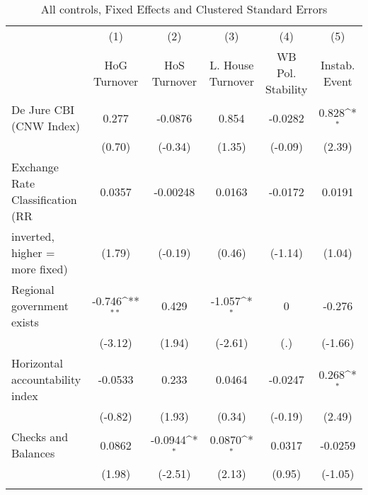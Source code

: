 \begin{table}[htbp]\centering
\def\sym#1{\ifmmode^{#1}\else\(^{#1}\)\fi}
\caption{All controls, Fixed Effects and Clustered Standard Errors \label{fullcmultIndFEDJ}}
\begin{tabular}{l*{5}{c}}
\toprule
                                        &\multicolumn{1}{c}{(1)}&\multicolumn{1}{c}{(2)}&\multicolumn{1}{c}{(3)}&\multicolumn{1}{c}{(4)}&\multicolumn{1}{c}{(5)}\\
                                        &\multicolumn{1}{c}{HoG Turnover}&\multicolumn{1}{c}{HoS Turnover}&\multicolumn{1}{c}{L. House Turnover}&\multicolumn{1}{c}{WB Pol. Stability}&\multicolumn{1}{c}{Instab. Event}\\
\midrule
De Jure CBI (CNW Index)                 &    0.277         &  -0.0876         &    0.854         &  -0.0282         &    0.828\sym{*}  \\
                                        &   (0.70)         &  (-0.34)         &   (1.35)         &  (-0.09)         &   (2.39)         \\
\addlinespace
Exchange Rate Classification (RR        &   0.0357         & -0.00248         &   0.0163         &  -0.0172         &   0.0191         \\
inverted, higher = more fixed)          &   (1.79)         &  (-0.19)         &   (0.46)         &  (-1.14)         &   (1.04)         \\
\addlinespace
Regional government exists              &   -0.746\sym{**} &    0.429         &   -1.057\sym{*}  &        0         &   -0.276         \\
                                        &  (-3.12)         &   (1.94)         &  (-2.61)         &      (.)         &  (-1.66)         \\
\addlinespace
Horizontal accountability index         &  -0.0533         &    0.233         &   0.0464         &  -0.0247         &    0.268\sym{*}  \\
                                        &  (-0.82)         &   (1.93)         &   (0.34)         &  (-0.19)         &   (2.49)         \\
\addlinespace
Checks and Balances                     &   0.0862         &  -0.0944\sym{*}  &   0.0870\sym{*}  &   0.0317         &  -0.0259         \\
                                        &   (1.98)         &  (-2.51)         &   (2.13)         &   (0.95)         &  (-1.05)         \\
\addlinespace

\end{tabular}
\end{table}
